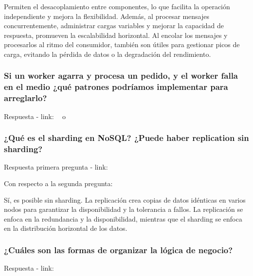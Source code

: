 \documentclass{article}
\begin{document}
  Permiten el desacoplamiento entre componentes, lo que facilita la operación independiente y mejora la flexibilidad. Además, al procesar mensajes concurrentemente, administrar cargas variables y mejorar la capacidad de respuesta, promueven la escalabilidad horizontal. Al encolar los mensajes y procesarlos al ritmo del consumidor, también son útiles para gestionar picos de carga, evitando la pérdida de datos o la degradación del rendimiento.

  \subsubsection{Si un worker agarra y procesa un pedido, y el worker falla en el medio ¿qué patrones podríamos implementar para arreglarlo?}

  Respuesta - link: \textbf{~} o \textbf{~}


  \subsubsection{¿Qué es el sharding en NoSQL? ¿Puede haber replication sin sharding?}
  Respuesta primera pregunta - link: \textbf{~}
  
  Con respecto a la segunda pregunta: 

  Sí, es posible sin sharding. La replicación crea copias de datos idénticas en varios nodos para garantizar la disponibilidad y la tolerancia a fallos. La replicación se enfoca en la redundancia y la disponibilidad, mientras que el sharding se enfoca en la distribución horizontal de los datos.



  \subsubsection{¿Cuáles son las formas de organizar la lógica de negocio?}
  Respuesta - link: \textbf{~}
\end{document}
